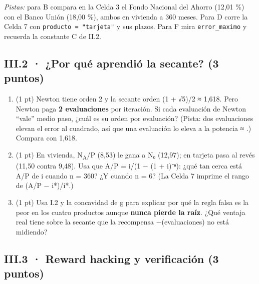 \emph{Pistas:} para B compara en la Celda 3 el Fondo Nacional del Ahorro (12,01 \%) con el Banco Unión (18,00 \%), ambos en vivienda a 360 meses. Para D corre la Celda 7 con \texttt{producto\ =\ "tarjeta"} y sus plazos. Para F mira \texttt{error\_maximo} y recuerda la constante C de II.2.

\subsection{III.2 · ¿Por qué aprendió la secante? (3 puntos)}

\begin{enumerate}
\def\labelenumi{\alph{enumi})}
\item
  (1 pt) Newton tiene orden 2 y la secante orden (1 + √5)/2 ≈ 1,618. Pero Newton paga \textbf{2 evaluaciones} por iteración. Si cada evaluación de Newton ``vale'' medio paso, ¿cuál es su orden por evaluación? (Pista: dos evaluaciones elevan el error al cuadrado, así que una evaluación lo eleva a la potencia  ≈ .) Compara con 1,618.
\item
  (1 pt) En vivienda, N\textsubscript{A}/P (8,53) le gana a N₀ (12,97); en tarjeta pasa al revés (11,50 contra 9,48). Usa que A/P = i/(1 − (1 + i)⁻ⁿ): ¿qué tan cerca está A/P de i cuando n = 360? ¿Y cuando n = 6? (La Celda 7 imprime el rango de (A/P − i*)/i*.)
\item
  (1 pt) Usa I.2 y la concavidad de g para explicar por qué la regla falsa es la peor en los cuatro productos aunque \textbf{nunca pierde la raíz}. ¿Qué ventaja real tiene sobre la secante que la recompensa −(evaluaciones) no está midiendo?
\end{enumerate}

\subsection{III.3 · Reward hacking y verificación (3 puntos)}

